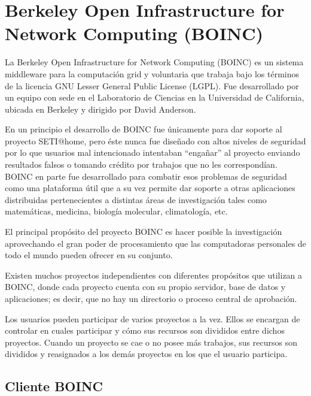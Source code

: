 \newpage
\section{Berkeley Open Infrastructure for Network Computing  (BOINC)}

La Berkeley Open Infrastructure for Network Computing (BOINC) es un sistema middleware para la computación grid y voluntaria que trabaja bajo los términos de la licencia GNU Lesser General Public License (LGPL). Fue desarrollado por un equipo con sede en el Laboratorio de Ciencias en la Universidad de California, ubicada en Berkeley y dirigido por David Anderson.

En un principio el desarrollo de BOINC fue únicamente para dar soporte al proyecto SETI@home, pero éste nunca fue diseñado con altos niveles de seguridad por lo que usuarios mal intencionado intentaban ``engañar'' al proyecto enviando resultados falsos o tomando crédito por trabajos que no les correspondían. BOINC en parte fue desarrollado para combatir esos problemas de seguridad como una plataforma útil que a su vez permite dar soporte a otras aplicaciones distribuidas pertenecientes a distintas áreas de investigación tales como matemáticas, medicina, biología molecular, climatología, etc. 

El principal propósito del proyecto BOINC es hacer posible la investigación aprovechando el gran poder de procesamiento que las computadoras personales de todo el mundo pueden ofrecer en su conjunto.

Existen muchos proyectos independientes con diferentes propósitos que utilizan a BOINC, donde cada proyecto cuenta con su propio servidor, base de datos y aplicaciones; es decir, que no hay un directorio o proceso central de aprobación. 

Los usuarios pueden participar de varios proyectos a la vez. Ellos se encargan de controlar en cuales participar y cómo sus recursos son divididos entre dichos proyectos. Cuando un proyecto se cae o no posee más trabajos, sus recursos son divididos y reasignados a los demás proyectos en los que el usuario participa.

\subsection{Cliente BOINC}\label{boinc:manager}

